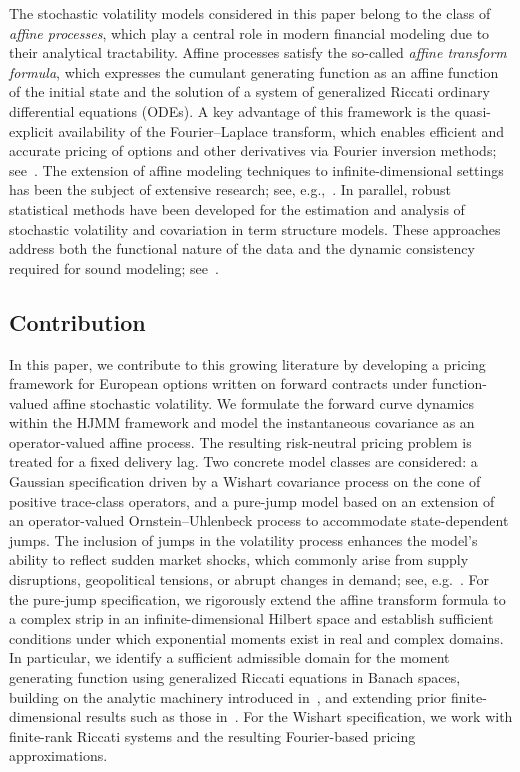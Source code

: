 \documentclass[10pt,a4paper,reqno]{amsart}
\numberwithin{equation}{section}
\theoremstyle{plain}
\theoremstyle{definition}
\theoremstyle{example}
\begin{document}
The stochastic volatility models considered in this paper belong to the class of \emph{affine processes}, which play a central role in modern financial modeling due to their analytical tractability. Affine processes satisfy the so-called \emph{affine transform formula}, which expresses the cumulant generating function as an affine function of the initial state and the solution of a system of generalized Riccati ordinary differential equations (ODEs). A key advantage of this framework is the quasi-explicit availability of the Fourier–Laplace transform, which enables efficient and accurate pricing of options and other derivatives via Fourier inversion methods; see~\cite{CM99, DFS03, eberlein2010analysis}. The extension of affine modeling techniques to infinite-dimensional settings has been the subject of extensive research; see, e.g.,~\cite{schmidt2020infinite, cuchiero2020generalized, benth2018ornstein, benth2018heston, Kar24, Kar25, FK24, cuchiero2025measure, benth2025measure}. In parallel, robust statistical methods have been developed for the estimation and analysis of stochastic volatility and covariation in term structure models. These approaches address both the functional nature of the data and the dynamic consistency required for sound modeling; see~\cite{schroers2024robustfunctionaldataanalysis, schroers2024dynamicallyconsistentanalysisrealized}. 

\subsection{Contribution} In this paper, we contribute to this growing literature by developing a pricing framework for European options written on forward contracts under function-valued affine stochastic volatility. We formulate the forward curve dynamics within the HJMM framework and model the instantaneous covariance as an operator-valued affine process. The resulting risk-neutral pricing problem is treated for a fixed delivery lag. Two concrete model classes are considered: a Gaussian specification driven by a Wishart covariance process on the cone of positive trace-class operators, and a pure-jump model based on an extension of an operator-valued Ornstein–Uhlenbeck process to accommodate state-dependent jumps. The inclusion of jumps in the volatility process enhances the model’s ability to reflect sudden market shocks, which commonly arise from supply disruptions, geopolitical tensions, or abrupt changes in demand; see, e.g.~\cite{leippold2010asset}. For the pure-jump specification, we rigorously extend the affine transform formula to a complex strip in an infinite-dimensional Hilbert space and establish sufficient conditions under which exponential moments exist in real and complex domains. In particular, we identify a sufficient admissible domain for the moment generating function using generalized Riccati equations in Banach spaces, building on the analytic machinery introduced in~\cite{Mar76}, and extending prior finite-dimensional results such as those in~\cite{KM15}. For the Wishart specification, we work with finite-rank Riccati systems and the resulting Fourier-based pricing approximations.
\end{document}
